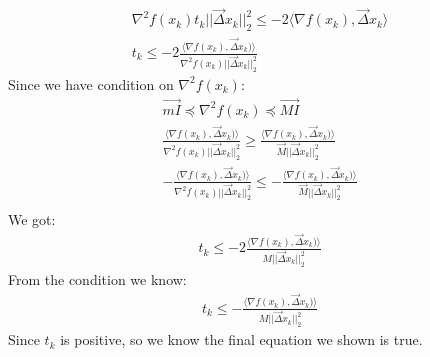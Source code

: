 \documentclass[12pt,twoside]{article}
\begin{document}
\begin{enumerate}[a)]
\begin{align}
\nabla^2 f(x_k)t_k||\vec{\Delta}x_k||_2^2 \leq - 2\langle\nabla f(x_k), \vec{\Delta}x_k\rangle\\
t_k \leq - 2\frac{\langle\nabla f(x_k), \vec{\Delta}x_k)\rangle}{\nabla^2 f(x_k)||\vec{\Delta}x_k||_2^2}
\end{align}
Since we have condition on $\nabla^2 f(x_k)$:
\begin{align}
\vec{mI} \preceq   \nabla^2 f(x_k) \preceq \vec{MI}\\
\frac{\langle\nabla f(x_k), \vec{\Delta}x_k)\rangle}{\nabla^2 f(x_k)||\vec{\Delta}x_k||_2^2} \geq \frac{\langle\nabla f(x_k), \vec{\Delta}x_k)\rangle}{\vec{M}||\vec{\Delta}x_k||_2^2}\\
- \frac{\langle\nabla f(x_k), \vec{\Delta}x_k)\rangle}{\nabla^2 f(x_k)||\vec{\Delta}x_k||_2^2} \leq - \frac{\langle\nabla f(x_k), \vec{\Delta}x_k)\rangle}{\vec{M}||\vec{\Delta}x_k||_2^2}\\
\end{align}
We got:
\begin{align}
t_k \leq - 2\frac{\langle\nabla f(x_k), \vec{\Delta}x_k)\rangle}{M||\vec{\Delta}x_k||_2^2}
\end{align}
From the condition we know:
\begin{align}
t_k \leq - \frac{\langle\nabla f(x_k), \vec{\Delta}x_k)\rangle}{M||\vec{\Delta}x_k||_2^2}
\end{align}
Since $t_k$ is positive, so we know the final equation we shown is true.\\


\end{enumerate}
\end{document}
